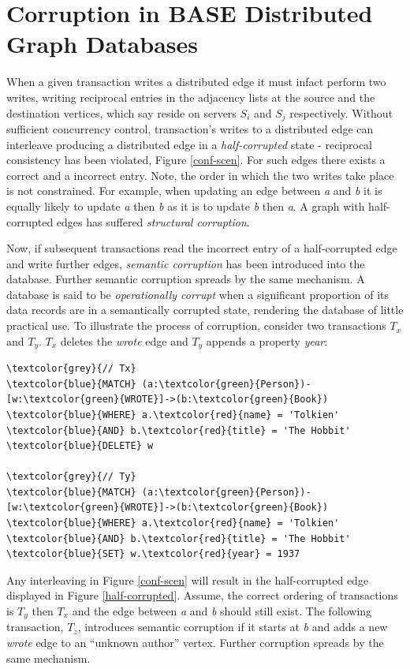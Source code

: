 \documentclass[sigplan,10pt]{acmart}
\begin{document}
\section{Corruption in BASE  Distributed Graph Databases}
\label{sec:db-corruption}

When a given transaction writes a distributed edge it must infact perform two writes, writing reciprocal entries in the adjacency lists at the source and the destination vertices, which say reside on servers $S_i$ and $S_j$ respectively. Without sufficient concurrency control, transaction's writes to a distributed edge can interleave producing a distributed edge in a \emph{half-corrupted} state - reciprocal consistency has been violated, Figure \ref{conf-scen}. For such edges there exists a correct and a incorrect entry. Note, the order in which the two writes take place is not constrained. For example, when updating an edge between \emph{a} and \emph{b} it is equally likely to update \emph{a} then \emph{b} as it is to update \emph{b} then \emph{a}. A graph with half-corrupted edges has suffered \emph{structural corruption}.

Now, if subsequent transactions read the incorrect entry of a half-corrupted edge and write further edges, \emph{semantic corruption} has been introduced into the database. Further semantic corruption spreads by the same mechanism. A database is said to be \emph{operationally corrupt} when a significant proportion of its data records are in a semantically corrupted state, rendering the database of little practical use. To illustrate the process of corruption, consider two transactions $T_x$ and $T_y$. $T_x$ deletes the \emph{wrote} edge and $T_y$ appends a property \emph{year}:
\begin{Verbatim}[commandchars=\\\{\},fontsize=\small,xleftmargin=.2in]
\textcolor{grey}{// Tx}
\textcolor{blue}{MATCH} (a:\textcolor{green}{Person})-[w:\textcolor{green}{WROTE}]->(b:\textcolor{green}{Book})
\textcolor{blue}{WHERE} a.\textcolor{red}{name} = 'Tolkien' \textcolor{blue}{AND} b.\textcolor{red}{title} = 'The Hobbit'
\textcolor{blue}{DELETE} w

\textcolor{grey}{// Ty}
\textcolor{blue}{MATCH} (a:\textcolor{green}{Person})-[w:\textcolor{green}{WROTE}]->(b:\textcolor{green}{Book})
\textcolor{blue}{WHERE} a.\textcolor{red}{name} = 'Tolkien' \textcolor{blue}{AND} b.\textcolor{red}{title} = 'The Hobbit'
\textcolor{blue}{SET} w.\textcolor{red}{year} = 1937
\end{Verbatim}
Any interleaving in Figure \ref{conf-scen} will result in the half-corrupted edge displayed in Figure \ref{half-corrupted}. Assume, the correct ordering of transactions is $T_y$ then $T_x$ and the edge between \emph{a} and \emph{b} should still exist. The following transaction, $T_z$, introduces semantic corruption if it starts at \emph{b} and adds a new \emph{wrote} edge to an ``unknown author'' vertex. Further corruption spreads by the same mechanism.
\end{document}
